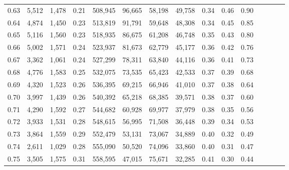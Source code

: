 \begin{tabular}{rrrcrrrrrrrrrrr}
0.63 &   5,512 &  1,478 &                                       0.21 &  508,945 &   96,665 &   58,198 &   49,758 &  0.34 &  0.46 &                         0.90 \\
0.64 &   4,874 &  1,450 &                                       0.23 &  513,819 &   91,791 &   59,648 &   48,308 &  0.34 &  0.45 &                         0.85 \\
0.65 &   5,116 &  1,560 &                                       0.23 &  518,935 &   86,675 &   61,208 &   46,748 &  0.35 &  0.43 &                         0.80 \\
0.66 &   5,002 &  1,571 &                                       0.24 &  523,937 &   81,673 &   62,779 &   45,177 &  0.36 &  0.42 &                         0.76 \\
0.67 &   3,362 &  1,061 &                                       0.24 &  527,299 &   78,311 &   63,840 &   44,116 &  0.36 &  0.41 &                         0.73 \\
0.68 &   4,776 &  1,583 &                                       0.25 &  532,075 &   73,535 &   65,423 &   42,533 &  0.37 &  0.39 &                         0.68 \\
0.69 &   4,320 &  1,523 &                                       0.26 &  536,395 &   69,215 &   66,946 &   41,010 &  0.37 &  0.38 &                         0.64 \\
0.70 &   3,997 &  1,439 &                                       0.26 &  540,392 &   65,218 &   68,385 &   39,571 &  0.38 &  0.37 &                         0.60 \\
0.71 &   4,290 &  1,592 &                                       0.27 &  544,682 &   60,928 &   69,977 &   37,979 &  0.38 &  0.35 &                         0.56 \\
0.72 &   3,933 &  1,531 &                                       0.28 &  548,615 &   56,995 &   71,508 &   36,448 &  0.39 &  0.34 &                         0.53 \\
0.73 &   3,864 &  1,559 &                                       0.29 &  552,479 &   53,131 &   73,067 &   34,889 &  0.40 &  0.32 &                         0.49 \\
0.74 &   2,611 &  1,029 &                                       0.28 &  555,090 &   50,520 &   74,096 &   33,860 &  0.40 &  0.31 &                         0.47 \\
0.75 &   3,505 &  1,575 &                                       0.31 &  558,595 &   47,015 &   75,671 &   32,285 &  0.41 &  0.30 &                         0.44 \\

\end{tabular}
